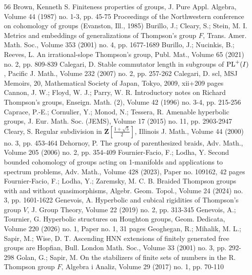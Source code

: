 \documentclass[10pt,a4paper]{article}
\theoremstyle{definition}
\theoremstyle{remark}
\theoremstyle{plain}
\begin{document}
\begin{thebibliography}{56}
Brown, Kenneth S. Finiteness properties of groups, J. Pure Appl. Algebra, Volume 44 (1987) no. 1-3, pp. 45-75 Proceedings of the Northwestern conference on cohomology of groups (Evanston, Ill., 1985)
Burillo, J.; Cleary, S.; Stein, M. I. Metrics and embeddings of generalizations of Thompson’s group ${F}$, Trans. Amer. Math. Soc., Volume 353 (2001) no. 4, pp. 1677-1689
Burillo, J.; Nucinkis, B.; Reeves, L. An irrational-slope Thompson’s group, Publ. Mat., Volume 65 (2021) no. 2, pp. 809-839
Calegari, D. Stable commutator length in subgroups of ${\rm {PL}}^+({I})$, Pacific J. Math., Volume 232 (2007) no. 2, pp. 257-262
Calegari, D. scl, MSJ Memoirs, 20, Mathematical Society of Japan, Tokyo, 2009, xii+209 pages
Cannon, J. W.; Floyd, W. J.; Parry, W. R. Introductory notes on Richard Thompson’s groups, Enseign. Math. (2), Volume 42 (1996) no. 3-4, pp. 215-256
Caprace, P.-E.; Cornulier, Y.; Monod, N.; Tessera, R. Amenable hyperbolic groups, J. Eur. Math. Soc. (JEMS), Volume 17 (2015) no. 11, pp. 2903-2947
Cleary, S. Regular subdivision in $\mathbf{Z}[\frac{1+\sqrt{5}}{2}]$, Illinois J. Math., Volume 44 (2000) no. 3, pp. 453-464
Dehornoy, P. The group of parenthesized braids, Adv. Math., Volume 205 (2006) no. 2, pp. 354-409
Fournier-Facio, F.; Lodha, Y. Second bounded cohomology of groups acting on 1-manifolds and applications to spectrum problems, Adv. Math., Volume 428 (2023), Paper no. 109162, 42 pages
Fournier-Facio, F.; Lodha, Y.; Zaremsky, M. C. B. Braided Thompson groups with and without quasimorphisms, Algebr. Geom. Topol., Volume 24 (2024) no. 3, pp. 1601-1622
Genevois, A. Hyperbolic and cubical rigidities of Thompson’s group ${V}$, J. Group Theory, Volume 22 (2019) no. 2, pp. 313-345
Genevois, A.; Tournier, G. Hyperbolic structures on Houghton groups, Geom. Dedicata, Volume 220 (2026) no. 1, Paper no. 1, 31 pages
Geoghegan, R.; Mihalik, M. L.; Sapir, M.; Wise, D. T. Ascending HNN extensions of finitely generated free groups are Hopfian, Bull. London Math. Soc., Volume 33 (2001) no. 3, pp. 292-298
Golan, G.; Sapir, M. On the stabilizers of finite sets of numbers in the R. Thompson group ${F}$, Algebra i Analiz, Volume 29 (2017) no. 1, pp. 70-110

\end{thebibliography}
\end{document}
